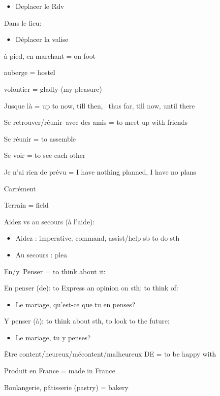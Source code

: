 \begin{itemize}
\item
  Deplacer le Rdv
\end{itemize}

Dans le lieu:

\begin{itemize}
\item
  Déplacer la valise
\end{itemize}

à pied, en marchant = on foot

auberge = hostel

volontier = gladly (my pleasure)

Jusque là = up to now, till then,~ thus far, till now, until there

Se retrouver/réunir~avec des amis = to meet up with friends~

Se réunir = to assemble~

Se voir = to see each other~

Je n'ai rien de prévu = I have nothing planned, I have no plans~

Carrément~

Terrain = field~

Aidez vs au secours (à l'aide):

\begin{itemize}
\item
  Aidez : imperative, command, assist/help sb to do sth
\item
  Au secours : plea
\end{itemize}

En/y~Penser = to think about it:~

En penser (de): to Express an opinion on sth; to think of:

\begin{itemize}
\item
  Le mariage, qu'est-ce que tu en penses?
\end{itemize}

Y penser (à): to think about sth, to look to the future:

\begin{itemize}
\item
  Le mariage, tu y penses?
\end{itemize}

Être content/heureux/mécontent/malheureux DE = to be happy with

Produit en France = made in France~

Boulangerie, pâtisserie (pastry) = bakery~

